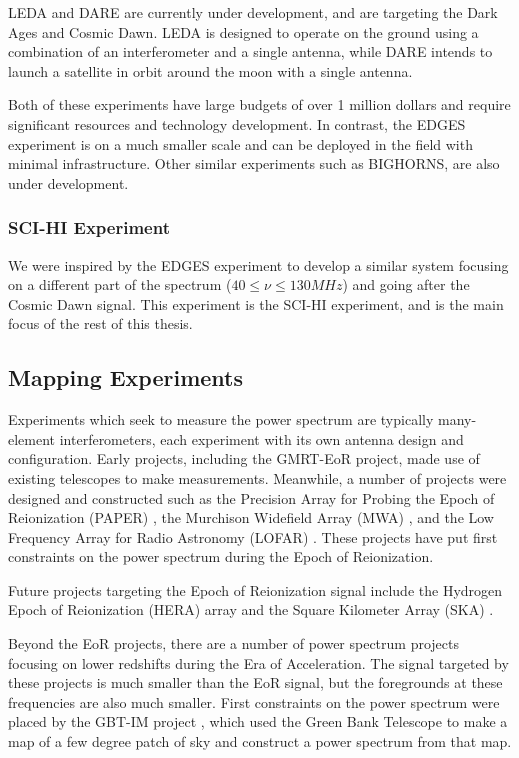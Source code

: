 LEDA \cite{leda}\cite{bernardi_2014} and DARE \cite{burns_2011} are currently under development, and are targeting the Dark Ages and Cosmic Dawn. LEDA is designed to operate on the ground using a combination of an interferometer and a single antenna, while DARE intends to launch a satellite in orbit around the moon with a single antenna. 

Both of these experiments have large budgets of over 1 million dollars and require significant resources and technology development. In contrast, the EDGES experiment is on a much smaller scale and can be deployed in the field with minimal infrastructure. Other similar experiments such as BIGHORNS\cite{bighorns}\cite{sokolowski_2015}, are also under development. 

\subsubsection{SCI-HI Experiment}

We were inspired by the EDGES experiment to develop a similar system focusing on a different part of the \cm spectrum ($40 \leq \nu \leq 130 MHz$) and going after the Cosmic Dawn signal. This experiment is the SCI-HI experiment, and is the main focus of the rest of this thesis. 


\subsection{Mapping Experiments}

Experiments which seek to measure the \cm power spectrum are typically many-element interferometers, each experiment with its own antenna design and configuration. Early projects, including the GMRT-EoR \cite{paciga_2013} project, made use of existing telescopes to make measurements. Meanwhile, a number of projects were designed and constructed such as the Precision Array for Probing the Epoch of Reionization (PAPER) \cite{pober_2013}\cite{jacobs_2014}, the Murchison Widefield Array (MWA) \cite{bernardi_2013}\cite{tingay_2012}, and the Low Frequency Array for Radio Astronomy (LOFAR) \cite{jelic_2014}\cite{lofar}. These projects have put first constraints on the power spectrum during the Epoch of Reionization. 

Future projects targeting the Epoch of Reionization signal include the Hydrogen Epoch of Reionization (HERA) \cite{hera}\cite{bernardi_2014} array and the Square Kilometer Array (SKA) \cite{ska}.

Beyond the EoR projects, there are a number of power spectrum projects focusing on lower redshifts during the Era of Acceleration. The \cm signal targeted by these projects is much smaller than the EoR signal, but the foregrounds at these frequencies are also much smaller. First constraints on the power spectrum were placed by the GBT-IM project \cite{masui_2012}\cite{switzer_2013}, which used the Green Bank Telescope to make a map of a few degree patch of sky and construct a power spectrum from that map. 

